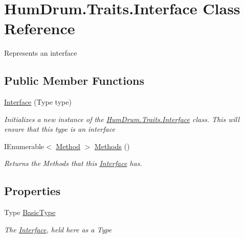 \hypertarget{classHumDrum_1_1Traits_1_1Interface}{}\section{Hum\+Drum.\+Traits.\+Interface Class Reference}
\label{classHumDrum_1_1Traits_1_1Interface}


Represents an interface  


\subsection*{Public Member Functions}
\begin{DoxyCompactItemize}
\item 
\hyperlink{classHumDrum_1_1Traits_1_1Interface_a71ea0b76df521bd6a3980b7cbdfe7bda}{Interface} (Type type)
\begin{DoxyCompactList}\small\item\em Initializes a new instance of the \hyperlink{classHumDrum_1_1Traits_1_1Interface}{Hum\+Drum.\+Traits.\+Interface} class. This will ensure that this type is an interface \end{DoxyCompactList}\item 
I\+Enumerable$<$ \hyperlink{classHumDrum_1_1Traits_1_1Method}{Method} $>$ \hyperlink{classHumDrum_1_1Traits_1_1Interface_a8804cbfd180dd33d913f30057db2b56a}{Methods} ()
\begin{DoxyCompactList}\small\item\em Returns the Methods that this \hyperlink{classHumDrum_1_1Traits_1_1Interface}{Interface} has. \end{DoxyCompactList}\end{DoxyCompactItemize}
\subsection*{Properties}
\begin{DoxyCompactItemize}
\item 
Type \hyperlink{classHumDrum_1_1Traits_1_1Interface_a027e973a547e202a2af1b34c2e5bc868}{Basic\+Type}
\begin{DoxyCompactList}\small\item\em The \hyperlink{classHumDrum_1_1Traits_1_1Interface}{Interface}, held here as a Type \end{DoxyCompactList}\end{DoxyCompactItemize}


